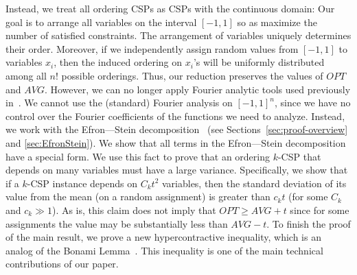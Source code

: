 \documentclass[11pt]{article}
\begin{document}
Instead, we treat all ordering CSPs as CSPs with the continuous domain: Our goal is to arrange
all variables on the interval $[-1,1]$ so as maximize the number of satisfied constraints.
The arrangement of variables uniquely  determines their order. Moreover, if we
independently assign random values from $[-1,1]$ to variables $x_i$, then the induced ordering on $x_i$'s will be
uniformly distributed among all $n!$ possible orderings.
Thus, our reduction preserves the values of $OPT$ and $AVG$. However, we can no longer
apply Fourier analytic tools used previously in~\cite{AGKSY, GZ, Mak}. We cannot use the
(standard) Fourier analysis on $[-1,1]^n$, since we have no control over the Fourier coefficients
of the functions we  need to analyze. Instead, we work with the Efron---Stein decomposition~\cite{ES}
(see Sections~\ref{sec:proof-overview} and \ref{sec:EfronStein}). We show that all terms in
the Efron---Stein decomposition have a special form. We use this fact to prove that an
ordering $k$-CSP that depends on many variables must have a large variance.
Specifically, we show that
if a $k$-CSP instance depends on $C_k t^2$ variables, then the standard deviation of its value from the mean
(on a random assignment) is greater than $c_k t$ (for some $C_k$ and $c_k\gg1$). As is, this claim does not imply that
$OPT \geq AVG + t$ since for some assignments the value may be substantially less than $AVG-t$.
To finish the proof of the main result, we prove a new hypercontractive inequality, which is
an analog of the Bonami Lemma~\cite{Bonami}. This inequality is one of the main
technical contributions of our paper.
\end{document}
